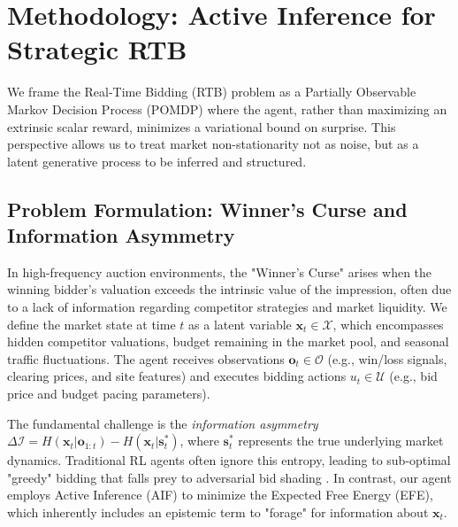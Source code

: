 \section{Methodology: Active Inference for Strategic RTB}
\label{sec:method}

We frame the Real-Time Bidding (RTB) problem as a Partially Observable Markov Decision Process (POMDP) where the agent, rather than maximizing an extrinsic scalar reward, minimizes a variational bound on surprise. This perspective allows us to treat market non-stationarity not as noise, but as a latent generative process to be inferred and structured.

\subsection{Problem Formulation: Winner's Curse and Information Asymmetry}
In high-frequency auction environments, the "Winner's Curse" arises when the winning bidder's valuation exceeds the intrinsic value of the impression, often due to a lack of information regarding competitor strategies and market liquidity. We define the market state at time $t$ as a latent variable $\mathbf{x}_t \in \mathcal{X}$, which encompasses hidden competitor valuations, budget remaining in the market pool, and seasonal traffic fluctuations. The agent receives observations $\mathbf{o}_t \in \mathcal{O}$ (e.g., win/loss signals, clearing prices, and site features) and executes bidding actions $u_t \in \mathcal{U}$ (e.g., bid price and budget pacing parameters).

The fundamental challenge is the \textit{information asymmetry} $\Delta \mathcal{I} = H(\mathbf{x}_t | \mathbf{o}_{1:t}) - H(\mathbf{x}_t | \mathbf{s}_t^*)$, where $\mathbf{s}_t^*$ represents the true underlying market dynamics. Traditional RL agents often ignore this entropy, leading to sub-optimal "greedy" bidding that falls prey to adversarial bid shading \cite{ref_new_GenerativeBidSh}. In contrast, our agent employs Active Inference (AIF) to minimize the Expected Free Energy (EFE), which inherently includes an epistemic term to "forage" for information about $\mathbf{x}_t$.

